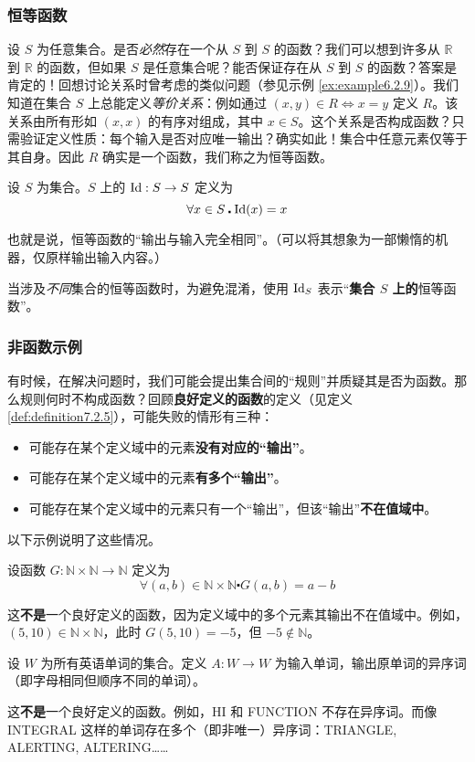 \subsubsection*{恒等函数}

设 $S$ 为任意集合。是否\emph{必然}存在一个从 $S$ 到 $S$ 的函数？我们可以想到许多从 $\mathbb{R}$ 到 $\mathbb{R}$ 的函数，但如果 $S$ 是任意集合呢？能否保证存在从 $S$ 到 $S$ 的函数？答案是肯定的！回想讨论关系时曾考虑的类似问题（参见示例 \ref{ex:example6.2.9}）。我们知道在集合 $S$ 上总能定义\emph{等价关系}：例如通过 $(x, y) \in R \iff x = y$ 定义 $R$。该关系由所有形如 $(x, x)$ 的有序对组成，其中 $x \in S$。这个关系是否构成函数？只需验证定义性质：每个输入是否对应唯一输出？确实如此！集合中任意元素仅等于其自身。因此 $R$ 确实是一个函数，我们称之为恒等函数。

\begin{definition}[恒等函数]
    设 $S$ 为集合。$S$ 上的 $\text{Id} : S \to S$ 定义为
    \[\forall x \in S \centerdot \text{Id}(x) = x\]
\end{definition}

也就是说，恒等函数的``输出与输入完全相同''。（可以将其想象为一部懒惰的机器，仅原样输出输入内容。）

当涉及\emph{不同}集合的恒等函数时，为避免混淆，使用 $\text{Id}_S$ 表示``\textbf{集合 $S$ 上的}恒等函数''。

\subsubsection*{非函数示例}

有时候，在解决问题时，我们可能会提出集合间的``规则''并质疑其是否为函数。那么规则何时不构成函数？回顾\textbf{良好定义的函数}的定义（见定义 \ref{def:definition7.2.5}），可能失败的情形有三种：

\begin{itemize}
    \item 可能存在某个定义域中的元素\textbf{没有对应的``输出''}。
    \item 可能存在某个定义域中的元素\textbf{有多个``输出''}。
    \item 可能存在某个定义域中的元素只有一个``输出''，但该``输出''\textbf{不在值域中}。
\end{itemize}
以下示例说明了这些情况。\\

\begin{example}
    设函数 $G : \mathbb{N} \times \mathbb{N} \to \mathbb{N}$ 定义为
    \[\forall (a, b) \in \mathbb{N} \times \mathbb{N} \centerdot G(a, b) = a - b\]

    这\textbf{不是}一个良好定义的函数，因为定义域中的多个元素其输出不在值域中。例如，$(5, 10) \in \mathbb{N} \times \mathbb{N}$，此时 $G(5, 10) = -5$，但 $-5 \notin \mathbb{N}$。
\end{example}

\clearpage

\begin{example}
    设 $W$ 为所有英语单词的集合。定义 $A: W \to W$ 为输入单词，输出原单词的异序词（即字母相同但顺序不同的单词）。
    
    这\textbf{不是}一个良好定义的函数。例如，HI 和 FUNCTION 不存在异序词。而像 INTEGRAL 这样的单词存在多个（即非唯一）异序词：TRIANGLE, ALERTING, ALTERING……
\end{example}
